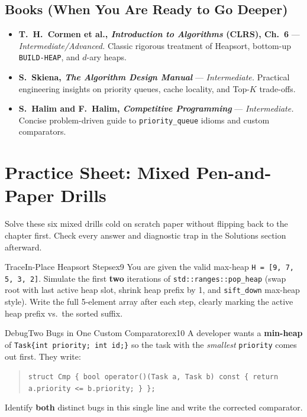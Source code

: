 \documentclass[11pt,a4paper]{article}
\theoremstyle{definition}
\begin{document}
\subsection*{Books (When You Are Ready to Go Deeper)}
\begin{itemize}
    \item \textbf{T.\ H.\ Cormen et al., \emph{Introduction to Algorithms} (CLRS), Ch.~6} --- \emph{Intermediate/Advanced.} Classic rigorous treatment of Heapsort, bottom-up \texttt{BUILD-HEAP}, and $d$-ary heaps.
    \item \textbf{S.\ Skiena, \emph{The Algorithm Design Manual}} --- \emph{Intermediate.} Practical engineering insights on priority queues, cache locality, and Top-$K$ trade-offs.
    \item \textbf{S.\ Halim and F.\ Halim, \emph{Competitive Programming}} --- \emph{Intermediate.} Concise problem-driven guide to \texttt{priority\_queue} idioms and custom comparators.
\end{itemize}

\section*{Practice Sheet: Mixed Pen-and-Paper Drills}

Solve these six mixed drills cold on scratch paper without flipping back to the chapter first. Check every answer and diagnostic trap in the Solutions section afterward.

\begin{tryitbox}{Trace}{In-Place Heapsort Steps}{ex9}
You are given the valid max-heap \texttt{H = [9, 7, 5, 3, 2]}. Simulate the first \textbf{two} iterations of \texttt{std::ranges::pop\_heap} (swap root with last active heap slot, shrink heap prefix by 1, and \texttt{sift\_down} max-heap style). Write the full 5-element array after each step, clearly marking the active heap prefix vs.\ the sorted suffix.
\end{tryitbox}

\begin{tryitbox}{Debug}{Two Bugs in One Custom Comparator}{ex10}
A developer wants a \textbf{min-heap} of \texttt{Task\{int priority; int id;\}} so the task with the \emph{smallest} \texttt{priority} comes out first. They write:
\begin{quote}
\texttt{struct Cmp \{ bool operator()(Task a, Task b) const \{ return a.priority <= b.priority; \} \};}
\end{quote}
Identify \textbf{both} distinct bugs in this single line and write the corrected comparator.
\end{tryitbox}
\end{document}
